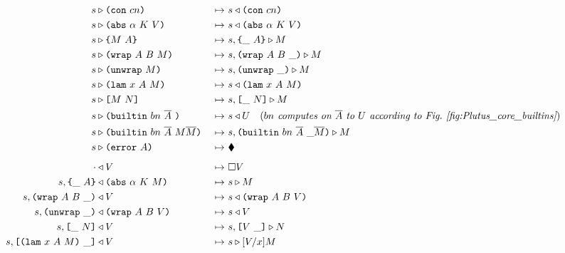 \documentclass[../plutus-core-specification.tex]{subfiles}
\begin{document}
\begin{figure}[H]
\begin{subfigure}[c]{\linewidth}
\hspace{-1cm}\begin{minipage}{\linewidth}  
\begin{alignat*}{2}
        \cksteps{\ckforward{s&}{\con{cn}}&} {&\ckbackward{s}{\con{cn}}}\\
        \cksteps{\ckforward{s&}{\abs{\alpha}{K}{V}}&} {&\ckbackward{s}{\abs{\alpha}{K}{V}}}\\
        \cksteps{\ckforward{s&}{\inst{M}{A}}&} {&\ckforward{s, \inInstLeftFrame{A}}{M}}\\
        \cksteps{\ckforward{s&}{\wrap{A}{B}{M}}&} {&\ckforward{s, \inWrapRightFrame{A}{B}}{M}}\\
        \cksteps{\ckforward{s&}{\unwrap{M}}&} {&\ckforward{s, \inUnwrapFrame{}}{M}}\\
        \cksteps{\ckforward{s&}{\lam{x}{A}{M}}&} {&\ckbackward{s}{\lam{x}{A}{M}}}\\
        \cksteps{\ckforward{s&}{\app{M}{N}}&} {&\ckforward{s, \inAppLeftFrame{N}}{M}}\\
        \cksteps{\ckforward{s&}{\builtin{bn}{\repetition{A}}{}}&} {&\ckbackward{s}{U}} 
              \quad (\textit{$bn$ computes on $\repetition{A}$ to $U$ according to Fig.~\ref{fig:Plutus_core_builtins}})\\
        \cksteps{\ckforward{s&}{\builtin{bn}{\repetition{A}}{M \repetition{M}}}&} {&\ckforward{s, \inBuiltin{bn}{\repetition{A}}{}{\_}{\repetition{M}}}{M}}\\
        \cksteps{\ckforward{s&}{\error{A}}&} {&\ckerror{}}\\
        \\[-10pt] %
        \cksteps{\ckbackward{\cdot&}{V}&} {&\square V}\\
        \cksteps{\ckbackward{s, \inInstLeftFrame{A}&}{\abs{\alpha}{K}{M}}&} {&\ckforward{s}{M}}\\
        \cksteps{\ckbackward{s, \inWrapRightFrame{A}{B}&}{V}&} {&\ckbackward{s}{\wrap{A}{B}{V}}}\\
        \cksteps{\ckbackward{s, \inUnwrapFrame{}&}{\wrap{A}{B}{V}}&} {&\ckbackward{s}{V}}\\
        \cksteps{\ckbackward{s, \inAppLeftFrame{N}&}{V}&} {&\ckforward{s, \inAppRightFrame{V}}{N}}\\
        \cksteps{\ckbackward{s, \inAppRightFrame{\lam{x}{A}{M}}&}{V}&} {&\ckforward{s}{\subst{V}{x}{M}}}\\

\end{alignat*}
\end{minipage}
\end{subfigure}
\end{figure}
\end{document}
